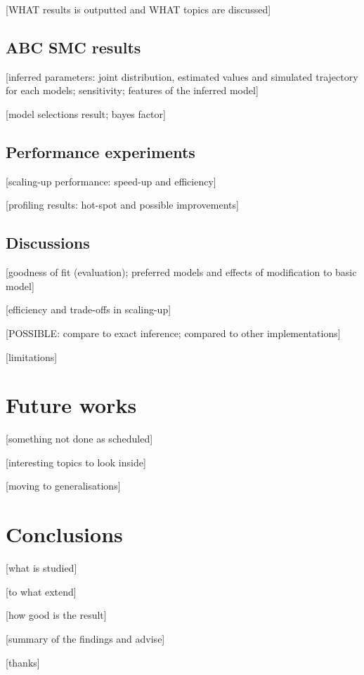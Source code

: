 \documentclass[12pt,a4paper]{report}
\begin{document}
[WHAT results is outputted and WHAT topics are discussed]

\section{ABC SMC results}

[inferred parameters: joint distribution, estimated values and simulated trajectory for each models; sensitivity; features of the inferred model]

[model selections result; bayes factor]

\section{Performance experiments}

[scaling-up performance: speed-up and efficiency]

[profiling results: hot-spot and possible improvements]

\section{Discussions}

[goodness of fit (evaluation); preferred models and effects of modification to basic model]

[efficiency and trade-offs in scaling-up]

[POSSIBLE: compare to exact inference; compared to other implementations]

[limitations]

\chapter{Future works}

[something not done as scheduled]

[interesting topics to look inside]

[moving to generalisations]

\chapter{Conclusions}

[what is studied]

[to what extend]

[how good is the result]

[summary of the findings and advise]

[thanks]
\end{document}
